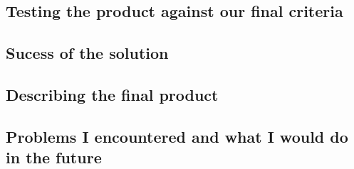 \documentclass[9pt]{article}
\begin{document}
\newpage
\subsection{Testing the product against our final criteria}











\newpage
\subsection{Sucess of the solution}











\newpage
\subsection{Describing the final product}












\newpage
\subsection{Problems I encountered and what I would do in the future}











\newpage
{}

\end{document}
